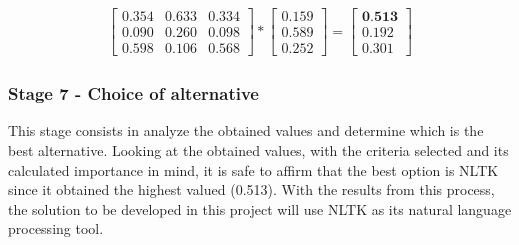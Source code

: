 \begin{gather}
    \begin{bmatrix}
        0.354 & 0.633 & 0.334 \\
        0.090 & 0.260 & 0.098 \\
        0.598 & 0.106 & 0.568
    \end{bmatrix}
    *
    \begin{bmatrix}
      0.159 \\
      0.589 \\
      0.252
    \end{bmatrix}
      =
    \begin{bmatrix}
      \textbf{0.513} \\
      0.192 \\
      0.301
    \end{bmatrix}
\end{gather}

\subsubsection{Stage 7 - Choice of alternative}

This stage consists in analyze the obtained values and determine which is the best alternative.
Looking at the obtained values, with the criteria selected and its calculated importance in mind, it is safe to affirm that the best option is NLTK since it obtained the highest valued (0.513).
With the results from this process, the solution to be developed in this project will use NLTK as its natural language processing tool.
